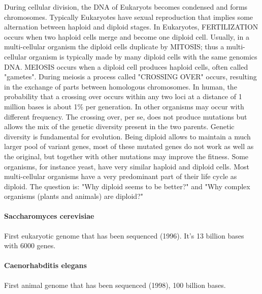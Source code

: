 During cellular division, the DNA of Eukaryots becomes condensed and forms
chromosomes. Typically Eukaryotes have sexual reproduction that implies some
alternation between haploid and diploid stages. In Eukaryotes, FERTILIZATION
occurs when two haploid cells merge and become one diploid cell. Usually, in a
multi-cellular organism the diploid cells duplicate by MITOSIS; thus a
multi-cellular organism is typically made by many diploid cells with the same
genomics DNA. MEIOSIS occurs when a diploid cell produces haploid cells, often
called "gametes". During meiosis a process called "CROSSING OVER" occurs,
resulting in the exchange of parts between homologous chromosomes. In human,
the probability that a crossing over occurs within any two loci at a distance
of 1 million bases is about 1\% per generation. In other organisms may occur
with different frequency. The crossing over, per se, does not produce mutations
but allows the mix of the genetic diversity present in the two parents. Genetic
diversity is fundamental for evolution. Being diploid allows to maintain a much
larger pool of variant genes, most of these mutated genes do not work as well
as the original, but together with other mutations may improve the fitness.
Some organisms, for instance yeast, have very similar haploid and diploid
cells. Most multi-cellular organisms have a very predominant part of their life
cycle as diploid. The question is: "Why diploid seems to be better?" and "Why
complex organisms (plants and animals) are diploid?"

\paragraph*{Saccharomyces cerevisiae}
First eukaryotic genome that has been sequenced (1996). It's 13 billion bases
with 6000 genes.

\paragraph*{Caenorhabditis elegans}
First animal genome that has been sequenced (1998), 100 billion bases.
